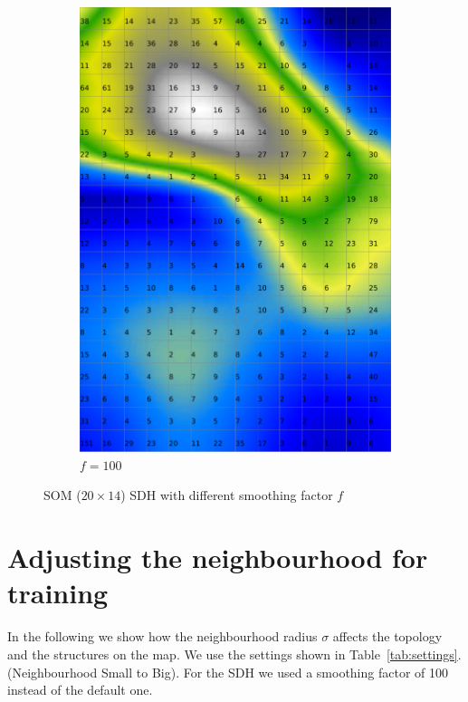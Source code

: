 \documentclass{acm_proc_article-sp}
\begin{document}
\begin{figure}
\begin{subfigure}[b]{0.30\linewidth}
        \includegraphics[width=\linewidth]{img/wine-weird-smoothed-data-histogram-100}
        \caption{$f=100$}
    \end{subfigure}
    \caption{SOM ($20\times14$) SDH with different smoothing factor $f$}
    \label{fig:wine-weird-smoothed-data-histogram-series}
\end{figure}

\section{Adjusting the neighbourhood for training}

In the following we show how the neighbourhood radius $\sigma$ affects the topology
and the structures on the map. We use the settings shown in Table~\ref{tab:settings}.
(Neighbourhood Small to Big).
For the SDH we used a smoothing factor of 100 instead of the default one.
\end{document}
